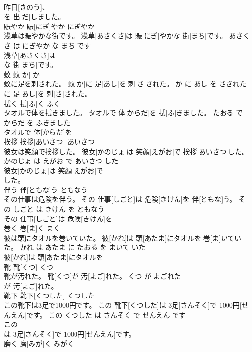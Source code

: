 \documentclass[8pt]{extreport}
\begin{document}
\begin{CJK}{UTF8}{min}
\\	昨日[きのう]、
\\	を 出[だ]しました。		
\\	賑やか	賑[にぎ]やか	にぎやか	
\\	浅草は賑やかな街です。	浅草[あさくさ]は 賑[にぎ]やかな 街[まち]です。	あさくさ は にぎやか な まち です	
\\	浅草[あさくさ]は
\\	な 街[まち]です。		
\\	蚊	蚊[か]	か	
\\	蚊に足を刺された。	蚊[か]に 足[あし]を 刺[さ]された。	か に あし を さされた	
\\	に 足[あし]を 刺[さ]された。		
\\	拭く	拭[ふ]く	ふく	
\\	タオルで体を拭きました。	タオルで 体[からだ]を 拭[ふ]きました。	たおる で からだ を ふきました	
\\	タオルで 体[からだ]を
\\	挨拶	挨拶[あいさつ]	あいさつ	
\\	彼女は笑顔で挨拶した。	彼女[かのじょ]は 笑顔[えがお]で 挨拶[あいさつ]した。	かのじょ は えがお で あいさつ した	
\\	彼女[かのじょ]は 笑顔[えがお]で
\\	した。		
\\	伴う	伴[ともな]う	ともなう	
\\	その仕事は危険を伴う。	その 仕事[しごと]は 危険[きけん]を 伴[ともな]う。	その しごと は きけん を ともなう	
\\	その 仕事[しごと]は 危険[きけん]を
\\	巻く	巻[ま]く	まく	
\\	彼は頭にタオルを巻いていた。	彼[かれ]は 頭[あたま]にタオルを 巻[ま]いていた。	かれ は あたま に たおる を まいて いた	
\\	彼[かれ]は 頭[あたま]にタオルを
\\	靴	靴[くつ]	くつ	
\\	靴が汚れた。	靴[くつ]が 汚[よご]れた。	くつ が よごれた	
\\	が 汚[よご]れた。		
\\	靴下	靴下[くつした]	くつした	
\\	この靴下は3足で1000円です。	この 靴下[くつした]は 3足[さんそく]で 1000円[せんえん]です。	この くつした は さんそく で せんえん です	
\\	この
\\	は 3足[さんそく]で 1000円[せんえん]です。		
\\	磨く	磨[みが]く	みがく	

\end{CJK}
\end{document}
